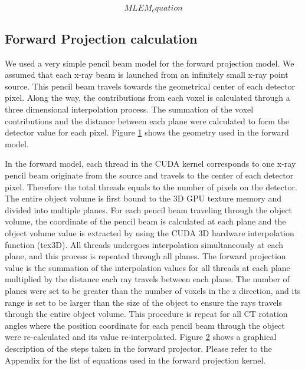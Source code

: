 \begin{equation}
MLEM_equation
\label{eq:MLEM}
\end{equation}

\begin{figure}[ht]
\centering
{}
\label{fig:forwardmodel}
\end{figure}


\subsection{Forward Projection calculation}
We used a very simple pencil beam model for the forward projection model.  We assumed that each x-ray beam is launched from an infinitely small x-ray point source.  This pencil beam travels towards the geometrical center of each detector pixel.  Along the way, the contributions from each voxel is calculated through a three dimensional interpolation process.  The summation of the voxel contributions and the distance between each plane were calculated to form the detector value for each pixel.  Figure \ref{fig:forwardmodel} shows the geometry used in the forward model.

\begin{figure}[ht]
\centering
{}
\label{fig:forwardmodelcode}
\end{figure}

In the forward model, each thread in the CUDA kernel corresponds to one x-ray pencil beam originate from the source and travels to the center of each detector pixel.  Therefore the total threads equals to the number of pixels on the detector.  The entire object volume is first bound to the 3D GPU texture memory and divided into multiple planes.  For each pencil beam traveling through the object volume, the coordinate of the pencil beam is calculated at each plane and the object volume value is extracted by using the CUDA 3D hardware interpolation function (tex3D).  All threads undergoes interpolation simultaneously at each plane, and this process is repeated through all planes.  The forward projection value is the summation of the interpolation values for all threads at each plane multiplied by the distance each ray travels between each plane.  The number of planes were set to be greater than the number of voxels in the z direction, and its range is set to be larger than the size of the object to ensure the rays travels through the entire object volume.  This procedure is repeat for all CT rotation angles where the position coordinate for each pencil beam through the object were re-calculated and its value re-interpolated.  Figure \ref{fig:forwardmodelcode} shows a graphical description of the steps taken in the forward projector.  Please refer to the Appendix for the list of equations used in the forward projection kernel.


